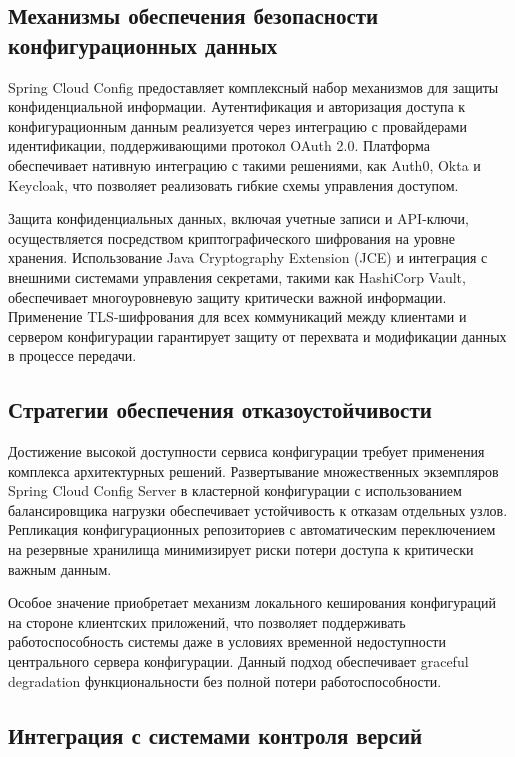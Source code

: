 \subsection{Механизмы обеспечения безопасности конфигурационных данных}

Spring Cloud Config предоставляет комплексный набор механизмов для защиты конфиденциальной информации. Аутентификация и авторизация доступа к конфигурационным данным реализуется через интеграцию с провайдерами идентификации, поддерживающими протокол OAuth 2.0. Платформа обеспечивает нативную интеграцию с такими решениями, как Auth0, Okta и Keycloak, что позволяет реализовать гибкие схемы управления доступом.

Защита конфиденциальных данных, включая учетные записи и API-ключи, осуществляется посредством криптографического шифрования на уровне хранения. Использование Java Cryptography Extension (JCE) и интеграция с внешними системами управления секретами, такими как HashiCorp Vault, обеспечивает многоуровневую защиту критически важной информации. Применение TLS-шифрования для всех коммуникаций между клиентами и сервером конфигурации гарантирует защиту от перехвата и модификации данных в процессе передачи.

\subsection{Стратегии обеспечения отказоустойчивости}

Достижение высокой доступности сервиса конфигурации требует применения комплекса архитектурных решений. Развертывание множественных экземпляров Spring Cloud Config Server в кластерной конфигурации с использованием балансировщика нагрузки обеспечивает устойчивость к отказам отдельных узлов. Репликация конфигурационных репозиториев с автоматическим переключением на резервные хранилища минимизирует риски потери доступа к критически важным данным.

Особое значение приобретает механизм локального кеширования конфигураций на стороне клиентских приложений, что позволяет поддерживать работоспособность системы даже в условиях временной недоступности центрального сервера конфигурации. Данный подход обеспечивает graceful degradation функциональности без полной потери работоспособности.

\subsection{Интеграция с системами контроля версий}

